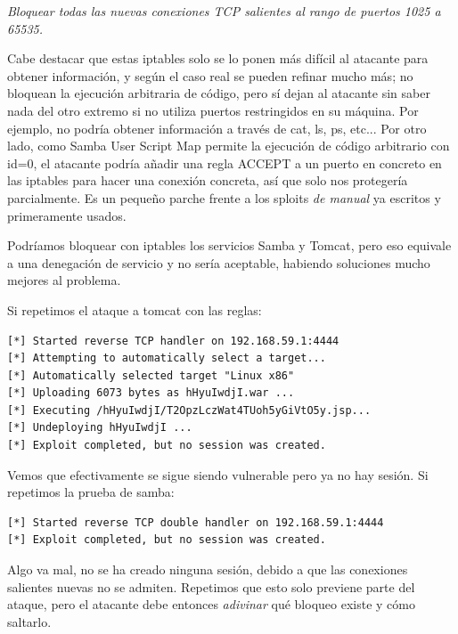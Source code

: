 \documentclass[a4paper,12pt]{scrartcl}
\begin{document}
\textit{Bloquear todas las nuevas conexiones TCP salientes al rango de puertos 1025 a 65535.}

\vspace{10pt}

Cabe destacar que estas iptables solo se lo ponen más difícil al atacante para obtener información, y según el caso real se pueden refinar mucho más; no bloquean la ejecución arbitraria de código, pero sí dejan al atacante sin saber nada del otro extremo si no utiliza puertos restringidos en su máquina. Por ejemplo, no podría obtener información a través de cat, ls, ps, etc... Por otro lado, como Samba User Script Map permite la ejecución de código arbitrario con id=0, el atacante podría añadir una regla ACCEPT a un puerto en concreto en las iptables para hacer una conexión concreta, así que solo nos protegería parcialmente. Es un pequeño parche frente a los sploits \textit{de manual} ya escritos y primeramente usados.

\vspace{10pt}

Podríamos bloquear con iptables los servicios Samba y Tomcat, pero eso equivale a una denegación de servicio y no sería aceptable, habiendo soluciones mucho mejores al problema.

\vspace{10pt}

\noindent Si repetimos el ataque a tomcat con las reglas:

\begin{verbatim}
[*] Started reverse TCP handler on 192.168.59.1:4444 
[*] Attempting to automatically select a target...
[*] Automatically selected target "Linux x86"
[*] Uploading 6073 bytes as hHyuIwdjI.war ...
[*] Executing /hHyuIwdjI/T2OpzLczWat4TUoh5yGiVtO5y.jsp...
[*] Undeploying hHyuIwdjI ...
[*] Exploit completed, but no session was created.
\end{verbatim}

\noindent Vemos que efectivamente se sigue siendo vulnerable pero ya no hay sesión. Si repetimos la prueba de samba:

\begin{verbatim}
[*] Started reverse TCP double handler on 192.168.59.1:4444 
[*] Exploit completed, but no session was created.
\end{verbatim}

Algo va mal, no se ha creado ninguna sesión, debido a que las conexiones salientes nuevas no se admiten. Repetimos que esto solo previene parte del ataque, pero el atacante debe entonces \textit{adivinar} qué bloqueo existe y cómo saltarlo.
\end{document}
